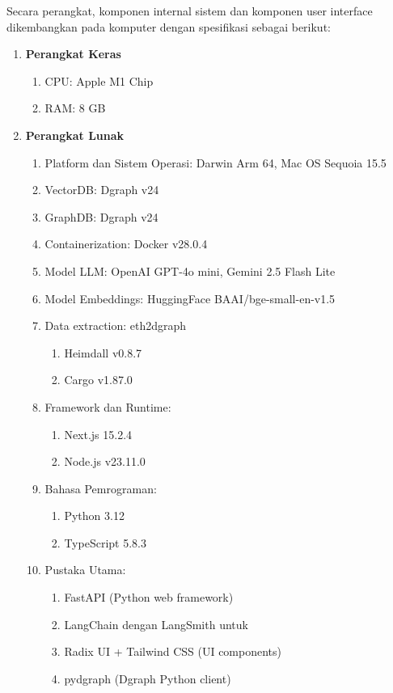 Secara perangkat, komponen internal sistem dan komponen user interface dikembangkan pada komputer dengan spesifikasi sebagai berikut:
\begin{enumerate}
	\item \textbf{Perangkat Keras}
	      \begin{enumerate}
		      \item CPU: Apple M1 Chip
		      \item RAM: 8 GB
	      \end{enumerate}
	\item \textbf{Perangkat Lunak}
	      \begin{enumerate}
		      \item Platform dan Sistem Operasi: Darwin Arm 64, Mac OS Sequoia 15.5
		      \item VectorDB: Dgraph v24
		      \item GraphDB: Dgraph v24
		      \item Containerization: Docker v28.0.4
		      \item Model LLM: OpenAI GPT-4o mini, Gemini 2.5 Flash Lite
		      \item Model Embeddings: HuggingFace BAAI/bge-small-en-v1.5
		      \item Data extraction: eth2dgraph
		            \begin{enumerate}
						\item Heimdall v0.8.7
						\item Cargo v1.87.0
					\end{enumerate}
		      \item Framework dan Runtime:
		            \begin{enumerate}
			            \item Next.js 15.2.4
			            \item Node.js v23.11.0
		            \end{enumerate}
		      \item Bahasa Pemrograman:
		            \begin{enumerate}
			            \item Python 3.12
			            \item TypeScript 5.8.3
		            \end{enumerate}
		      \item Pustaka Utama:
		            \begin{enumerate}
			            \item FastAPI (Python web framework)
			            \item LangChain dengan LangSmith untuk
			            \item Radix UI + Tailwind CSS (UI components)
			            \item pydgraph (Dgraph Python client)
		            \end{enumerate}
	      \end{enumerate}
\end{enumerate}